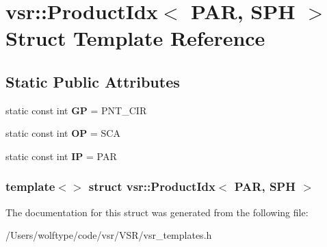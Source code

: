 \hypertarget{structvsr_1_1_product_idx_3_01_p_a_r_00_01_s_p_h_01_4}{\section{vsr\-:\-:Product\-Idx$<$ P\-A\-R, S\-P\-H $>$ Struct Template Reference}
\label{structvsr_1_1_product_idx_3_01_p_a_r_00_01_s_p_h_01_4}
}
\subsection*{Static Public Attributes}
\begin{DoxyCompactItemize}
\item 
\hypertarget{structvsr_1_1_product_idx_3_01_p_a_r_00_01_s_p_h_01_4_ab0152d8b76efcaab85c948f69eb8acad}{static const int {\bfseries G\-P} = P\-N\-T\-\_\-\-C\-I\-R}\label{structvsr_1_1_product_idx_3_01_p_a_r_00_01_s_p_h_01_4_ab0152d8b76efcaab85c948f69eb8acad}

\item 
\hypertarget{structvsr_1_1_product_idx_3_01_p_a_r_00_01_s_p_h_01_4_ac9735c071d9e2823d6b585c842afc74c}{static const int {\bfseries O\-P} = S\-C\-A}\label{structvsr_1_1_product_idx_3_01_p_a_r_00_01_s_p_h_01_4_ac9735c071d9e2823d6b585c842afc74c}

\item 
\hypertarget{structvsr_1_1_product_idx_3_01_p_a_r_00_01_s_p_h_01_4_a08b3c43a6576797d2bb099d4087be1d1}{static const int {\bfseries I\-P} = P\-A\-R}\label{structvsr_1_1_product_idx_3_01_p_a_r_00_01_s_p_h_01_4_a08b3c43a6576797d2bb099d4087be1d1}

\end{DoxyCompactItemize}
\subsubsection*{template$<$$>$ struct vsr\-::\-Product\-Idx$<$ P\-A\-R, S\-P\-H $>$}



The documentation for this struct was generated from the following file\-:\begin{DoxyCompactItemize}
\item 
/\-Users/wolftype/code/vsr/\-V\-S\-R/vsr\-\_\-templates.\-h\end{DoxyCompactItemize}
